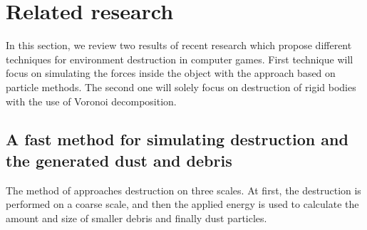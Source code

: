 
\section{Related research}
In this section, we review two results of recent research which propose different techniques for environment destruction in computer games. First technique will focus on simulating the forces inside the object with the approach based on particle methods. The second one will solely focus on destruction of rigid bodies with the use of Voronoi decomposition. 

\subsection{A fast method for simulating destruction and the generated dust
and debris}
\label{sec:edem}
The method of \citet{edem} approaches destruction on three scales. At first, the destruction is performed on a coarse scale, and then the applied energy is used to calculate the amount and size of smaller debris and finally dust particles.

